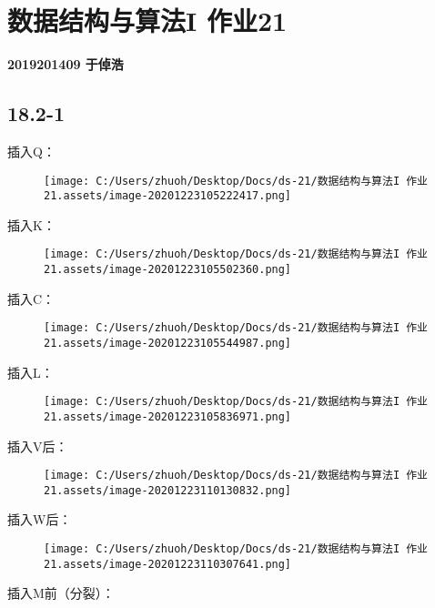 \documentclass[]{article}
\date{}
\begin{document}
\hypertarget{header-n62}{%
\section{数据结构与算法I 作业21}\label{header-n62}}

\textbf{2019201409 于倬浩}

\hypertarget{header-n65}{%
\subsection{18.2-1}\label{header-n65}}

插入Q：

\begin{figure}
\centering
\texttt{[image: C:/Users/zhuoh/Desktop/Docs/ds-21/数据结构与算法I 作业21.assets/image-20201223105222417.png]}
\caption{}
\end{figure}

插入K：

\begin{figure}
\centering
\texttt{[image: C:/Users/zhuoh/Desktop/Docs/ds-21/数据结构与算法I 作业21.assets/image-20201223105502360.png]}
\caption{}
\end{figure}

插入C：

\begin{figure}
\centering
\texttt{[image: C:/Users/zhuoh/Desktop/Docs/ds-21/数据结构与算法I 作业21.assets/image-20201223105544987.png]}
\caption{}
\end{figure}

插入L：

\begin{figure}
\centering
\texttt{[image: C:/Users/zhuoh/Desktop/Docs/ds-21/数据结构与算法I 作业21.assets/image-20201223105836971.png]}
\caption{}
\end{figure}

插入V后：

\begin{figure}
\centering
\texttt{[image: C:/Users/zhuoh/Desktop/Docs/ds-21/数据结构与算法I 作业21.assets/image-20201223110130832.png]}
\caption{}
\end{figure}

插入W后：

\begin{figure}
\centering
\texttt{[image: C:/Users/zhuoh/Desktop/Docs/ds-21/数据结构与算法I 作业21.assets/image-20201223110307641.png]}
\caption{}
\end{figure}

插入M前（分裂）：
\end{document}
